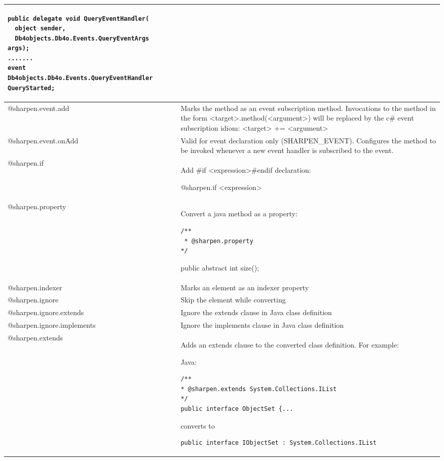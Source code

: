 {\begin{longtable}{|p{}|p{}|}
\begin{lstlisting}
public delegate void QueryEventHandler(
  object sender,
  Db4objects.Db4o.Events.QueryEventArgs args);
.......
event Db4objects.Db4o.Events.QueryEventHandler QueryStarted;
\end{lstlisting} \\ \hline
@sharpen.event.add & Marks the method as an event subscription method. Invocations to the method in the form \textless{}target\textgreater{}.method(\textless{}argument\textgreater{}) will be replaced by the c\# event subscription idiom: \textless{}target\textgreater{} += \textless{}argument\textgreater{} \\ \hline
@sharpen.event.onAdd & Valid for event declaration only (SHARPEN\_EVENT). Configures the method to be invoked whenever a new event handler is subscribed to the event. \\ \hline
@sharpen.if & Add \#if \textless{}expression\textgreater{}\#endif declaration:\par @sharpen.if \textless{}expression\textgreater{} \\ \hline
@sharpen.property & Convert a java method as a property:\par \begin{lstlisting}
/**
 * @sharpen.property
*/
\end{lstlisting}\par public abstract int size(); \\ \hline
@sharpen.indexer & Marks an element as an indexer property \\ \hline
@sharpen.ignore & Skip the element while converting \\ \hline
@sharpen.ignore.extends & Ignore the extends clause in Java class definition \\ \hline
@sharpen.ignore.implements & Ignore the implements clause in Java class definition \\ \hline
@sharpen.extends & Adds an extends clause to the converted class definition. For example:\par Java:\par \begin{lstlisting}
/**
* @sharpen.extends System.Collections.IList
*/
public interface ObjectSet {...
\end{lstlisting}\par converts to\par \begin{lstlisting}
public interface IObjectSet : System.Collections.IList
\end{lstlisting} \\ \hline

\end{longtable}}
